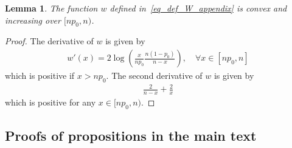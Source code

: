 \documentclass{article}
\newtheorem{lemma}{Lemma}
\begin{document}
\begin{lemma}\label{lem_W_cvx_increasing}
    The function $w$ defined in~\eqref{eq_def_W_appendix} is convex and increasing over $[np_0, n)$.
\end{lemma}
\begin{proof}
    The derivative of $w$ is given by
    \begin{align*}
        w'(x) = 2 \log\left(\frac{x}{np_0} \frac{n(1-p_0)}{n-x}\right), \quad \forall x \in [np_0,n]
    \end{align*}
    which is positive if $x > np_0$. 
    The second derivative of $w$ is given by
    \begin{align*}
        \frac{2}{n-x} + \frac{2}{x}
    \end{align*}
    which is positive for any $x \in [np_0,n)$. 
\end{proof}

\subsection{Proofs of propositions in the main text}
\end{document}
